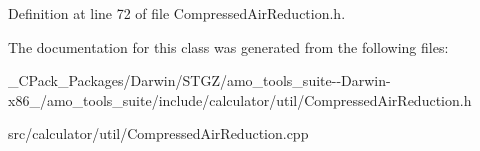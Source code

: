 Definition at line 72 of file Compressed\+Air\+Reduction.\+h.



The documentation for this class was generated from the following files\+:\begin{DoxyCompactItemize}
\item 
\+\_\+\+C\+Pack\+\_\+\+Packages/\+Darwin/\+S\+T\+G\+Z/amo\+\_\+tools\+\_\+suite-\/-\/\+Darwin-\/x86\+\_/amo\+\_\+tools\+\_\+suite/include/calculator/util/Compressed\+Air\+Reduction.\+h\item 
src/calculator/util/Compressed\+Air\+Reduction.\+cpp\end{DoxyCompactItemize}
